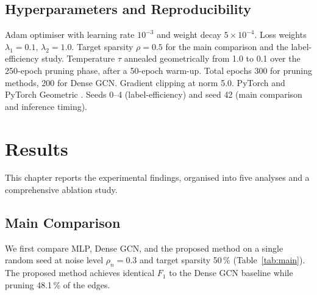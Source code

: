 \documentclass[11pt,a4paper]{report}
\theoremstyle{definition}
\theoremstyle{remark}
\begin{document}
\section{Hyperparameters and Reproducibility}

Adam optimiser with learning rate $10^{-3}$ and weight decay
$5\times 10^{-4}$. Loss weights $\lambda_1=0.1$, $\lambda_2=1.0$.
Target sparsity $\rho=0.5$ for the main comparison and the
label-efficiency study. Temperature $\tau$ annealed geometrically from
1.0 to 0.1 over the 250-epoch pruning phase, after a 50-epoch warm-up.
Total epochs 300 for pruning methods, 200 for Dense GCN. Gradient
clipping at norm 5.0. PyTorch \cite{paszke2019pytorch} and PyTorch
Geometric \cite{fey2019pyg}. Seeds 0--4 (label-efficiency) and seed 42
(main comparison and inference timing).

\chapter{Results}
\label{ch:results}

This chapter reports the experimental findings, organised into five
analyses and a comprehensive ablation study.

\section{Main Comparison}
\label{sec:main}

We first compare MLP, Dense GCN, and the proposed method on a single
random seed at noise level $\rho_n=0.3$ and target sparsity 50\,\%
(Table~\ref{tab:main}). The proposed method achieves identical $F_1$ to
the Dense GCN baseline while pruning 48.1\,\% of the edges.
\end{document}
